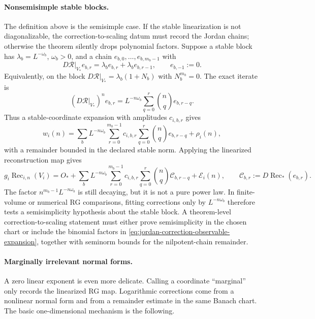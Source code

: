 \paragraph{Nonsemisimple stable blocks.}
The definition above is the semisimple case.  If the stable linearization is
not diagonalizable, the correction-to-scaling datum must record the Jordan
chains; otherwise the theorem silently drops polynomial factors.  Suppose a
stable block has \(\lambda_b=L^{-\omega_b}\), \(\omega_b>0\), and a chain
\(e_{b,0},\ldots,e_{b,m_b-1}\) with
\begin{equation}
  D\mathcal R|_{V_\ast} e_{b,r}
  =
  \lambda_b e_{b,r}+\lambda_b e_{b,r-1},
  \qquad
  e_{b,-1}:=0 .
  \label{eq:stable-jordan-chain-rg-corrections}
\end{equation}
Equivalently, on the block \(D\mathcal R|_{V_\ast}=\lambda_b(1+N_b)\) with
\(N_b^{m_b}=0\).  The exact iterate is
\begin{equation}
  (D\mathcal R|_{V_\ast})^n e_{b,r}
  =
  L^{-n\omega_b}
  \sum_{q=0}^{r}\binom{n}{q} e_{b,r-q}.
  \label{eq:stable-jordan-iterate-rg-corrections}
\end{equation}
Thus a stable-coordinate expansion with amplitudes \(c_{i,b,r}\) gives
\begin{equation}
  w_i(n)
  =
  \sum_b L^{-n\omega_b}
  \sum_{r=0}^{m_b-1} c_{i,b,r}
  \sum_{q=0}^{r}\binom{n}{q}e_{b,r-q}
  +
  \rho_i(n),
  \label{eq:jordan-correction-stable-coordinate-expansion}
\end{equation}
with a remainder bounded in the declared stable norm.  Applying the
linearized reconstruction map gives
\begin{equation}
  g_i\operatorname{Rec}_{i,n}(V_i)
  =
  O_\ast+
  \sum_b L^{-n\omega_b}
  \sum_{r=0}^{m_b-1} c_{i,b,r}
  \sum_{q=0}^{r}\binom{n}{q}\mathcal C_{b,r-q}
  +
  \mathcal E_i(n),
  \qquad
  \mathcal C_{b,r}:=D\operatorname{Rec}_\ast(e_{b,r}).
  \label{eq:jordan-correction-observable-expansion}
\end{equation}
The factor \(n^{m_b-1}L^{-n\omega_b}\) is still decaying, but it is not a
pure power law.  In finite-volume or numerical RG comparisons, fitting
corrections only by \(L^{-n\omega_b}\) therefore tests a semisimplicity
hypothesis about the stable block.  A theorem-level correction-to-scaling
statement must either prove semisimplicity in the chosen chart or include
the binomial factors in
\eqref{eq:jordan-correction-observable-expansion}, together with seminorm
bounds for the nilpotent-chain remainder.

\paragraph{Marginally irrelevant normal forms.}
A zero linear exponent is even more delicate.  Calling a coordinate
``marginal'' only records the linearized RG map.  Logarithmic corrections
come from a nonlinear normal form and from a remainder estimate in the same
Banach chart.  The basic one-dimensional mechanism is the following.


